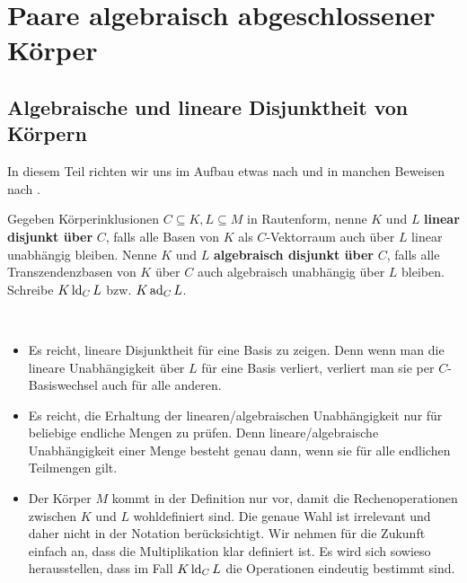 	\chapter{Paare algebraisch abgeschlossener Körper}
	\section{Algebraische und lineare Disjunktheit von Körpern}
	In diesem Teil richten wir uns im Aufbau etwas nach \cite{Delon} und in manchen Beweisen nach \cite{SergeLang}.
	
    \begin{definition}
    	Gegeben Körperinklusionen $C\subseteq K,L\subseteq M$ in Rautenform, nenne $K$ und $L$ \textbf{linear disjunkt über } $C$, falls alle Basen von $K$ als $C$-Vektorraum auch über $L$ linear unabhängig bleiben. Nenne $K$ und $L$ \textbf{algebraisch disjunkt über} $C$, falls alle Transzendenzbasen von $K$ über $C$ auch algebraisch unabhängig über $L$ bleiben. Schreibe $K\operatorname{ld}_CL$ bzw. $K\operatorname{ad}_CL$.
    \end{definition}
    
    \begin{remark}
    	\ 
    	\begin{itemize}
    		\item Es reicht, lineare Disjunktheit für eine Basis zu zeigen. Denn wenn man die lineare Unabhängigkeit über $L$ für eine Basis verliert, verliert man sie per $C$-Basiswechsel auch für alle anderen.
    		\item Es reicht, die Erhaltung der linearen/algebraischen Unabhängigkeit nur für beliebige endliche Mengen zu prüfen. Denn lineare/algebraische Unabhängigkeit einer Menge besteht genau dann, wenn sie für alle endlichen Teilmengen gilt.
    		\item Der Körper $M$ kommt in der Definition nur vor, damit die Rechenoperationen zwischen $K$ und $L$ wohldefiniert sind. Die genaue Wahl ist irrelevant und daher nicht in der Notation berücksichtigt. Wir nehmen für die Zukunft einfach an, dass die Multiplikation klar definiert ist. Es wird sich sowieso herausstellen, dass im Fall $K\operatorname{ld}_CL$ die Operationen eindeutig bestimmt sind.
    	\end{itemize}
    \end{remark}
    
